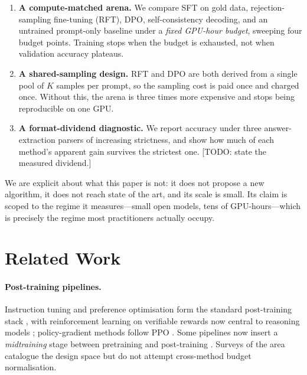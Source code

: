 \documentclass[11pt]{article}
\providecommand{\textcolor}[1]{}
\newcommand{\TODO}[1]{\textcolor{red}{[TODO: #1]}}
\begin{document}
\begin{enumerate}
  \item \textbf{A compute-matched arena.} We compare SFT on gold data,
        rejection-sampling fine-tuning (RFT), DPO, self-consistency decoding,
        and an untrained prompt-only baseline under a \emph{fixed GPU-hour
        budget}, sweeping four budget points. Training stops when the budget is
        exhausted, not when validation accuracy plateaus.
  \item \textbf{A shared-sampling design.} RFT and DPO are both derived from a
        single pool of $K$ samples per prompt, so the sampling cost is paid
        once and charged once. Without this, the arena is three times more
        expensive and stops being reproducible on one GPU.
  \item \textbf{A format-dividend diagnostic.} We report accuracy under three
        answer-extraction parsers of increasing strictness, and show how much
        of each method's apparent gain survives the strictest one.
        \TODO{state the measured dividend.}
\end{enumerate}

We are explicit about what this paper is not: it does not propose a new
algorithm, it does not reach state of the art, and its scale is small. Its
claim is scoped to the regime it measures---small open models, tens of
GPU-hours---which is precisely the regime most practitioners actually occupy.

\section{Related Work}

\paragraph{Post-training pipelines.}
Instruction tuning and preference optimisation form the standard post-training
stack \cite{ouyang2022instructgpt,rafailov2023dpo,lambert2024tulu3}, with
reinforcement learning on verifiable rewards now central to reasoning models
\cite{deepseek2025r1}; policy-gradient methods follow PPO
\cite{schulman2017ppo}. Some pipelines now insert a \emph{midtraining} stage
between pretraining and post-training \cite{midtraining2026}. Surveys of the
area \cite{posttraining2025survey,deepdive2025reasoning} catalogue the design
space but do not attempt cross-method budget normalisation.
\end{document}
